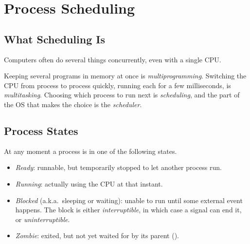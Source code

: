 \section{Process Scheduling}
\label{sec:sched}

\subsection{What Scheduling Is}

Computers often do several things concurrently, even with a single CPU.

\begin{definition}
  Keeping several programs in memory at once is \emph{multiprogramming}. Switching the CPU from process to process quickly, running each for a few milliseconds, is \emph{multitasking}. Choosing which process to run next is \emph{scheduling}, and the part of the OS that makes the choice is the \emph{scheduler}.
\end{definition}

\subsection{Process States}

\begin{definition}
  At any moment a process is in one of the following states.
  \begin{itemize}
    \item \emph{Ready}: runnable, but temporarily stopped to let another process run.
    \item \emph{Running}: actually using the CPU at that instant.
    \item \emph{Blocked} (a.k.a.\ sleeping or waiting): unable to run until some external event happens. The block is either \emph{interruptible}, in which case a signal can end it, or \emph{uninterruptible}.
    \item \emph{Zombie}: exited, but not yet waited for by its parent ().
  \end{itemize}
\end{definition}

